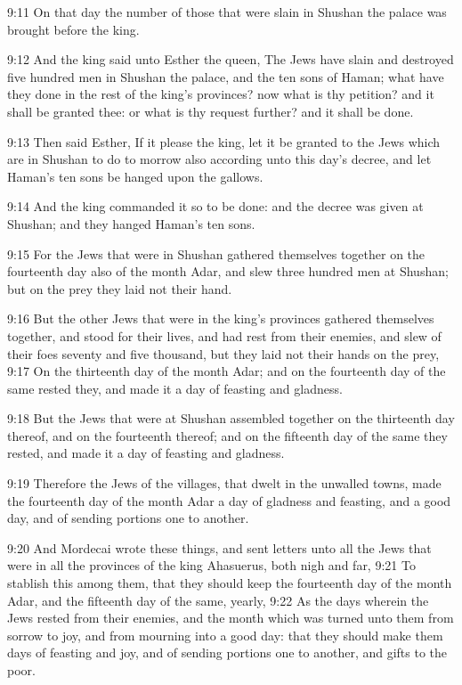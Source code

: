 9:11 On that day the number of those that were slain in Shushan the palace was brought before the king.

9:12 And the king said unto Esther the queen, The Jews have slain and destroyed five hundred men in Shushan the palace, and the ten sons of Haman; what have they done in the rest of the king's provinces? now what is thy petition? and it shall be granted thee: or what is thy request further? and it shall be done.

9:13 Then said Esther, If it please the king, let it be granted to the Jews which are in Shushan to do to morrow also according unto this day's decree, and let Haman's ten sons be hanged upon the gallows.

9:14 And the king commanded it so to be done: and the decree was given at Shushan; and they hanged Haman's ten sons.

9:15 For the Jews that were in Shushan gathered themselves together on the fourteenth day also of the month Adar, and slew three hundred men at Shushan; but on the prey they laid not their hand.

9:16 But the other Jews that were in the king's provinces gathered themselves together, and stood for their lives, and had rest from their enemies, and slew of their foes seventy and five thousand, but they laid not their hands on the prey, 9:17 On the thirteenth day of the month Adar; and on the fourteenth day of the same rested they, and made it a day of feasting and gladness.

9:18 But the Jews that were at Shushan assembled together on the thirteenth day thereof, and on the fourteenth thereof; and on the fifteenth day of the same they rested, and made it a day of feasting and gladness.

9:19 Therefore the Jews of the villages, that dwelt in the unwalled towns, made the fourteenth day of the month Adar a day of gladness and feasting, and a good day, and of sending portions one to another.

9:20 And Mordecai wrote these things, and sent letters unto all the Jews that were in all the provinces of the king Ahasuerus, both nigh and far, 9:21 To stablish this among them, that they should keep the fourteenth day of the month Adar, and the fifteenth day of the same, yearly, 9:22 As the days wherein the Jews rested from their enemies, and the month which was turned unto them from sorrow to joy, and from mourning into a good day: that they should make them days of feasting and joy, and of sending portions one to another, and gifts to the poor.


